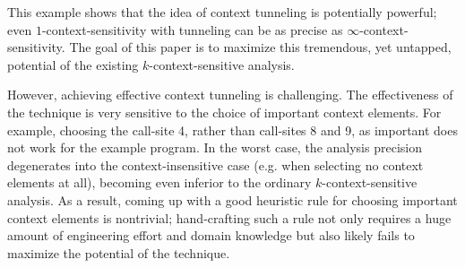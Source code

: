 

This example shows that the idea of context tunneling is potentially
powerful; even $1$-context-sensitivity with
tunneling can be as precise as
$\infty$-context-sensitivity. The goal of this paper is to maximize
this tremendous, yet untapped, potential of the existing $k$-context-sensitive analysis.


However, achieving effective context tunneling is
challenging. The effectiveness of the technique is very sensitive
to the choice of important context elements.  For example,
choosing the call-site 4, rather than call-sites 8 and 9, as important does not
work for the example program.  In the worst case, the analysis
precision degenerates into the context-insensitive case (e.g. when
selecting no context elements at all), becoming even inferior to the
ordinary
$k$-context-sensitive analysis.  As a result, coming up with a good
heuristic rule for choosing important context elements is nontrivial;
hand-crafting such a rule not only requires a huge amount of
engineering effort and domain knowledge but also likely fails to
maximize the potential of the technique.

%

